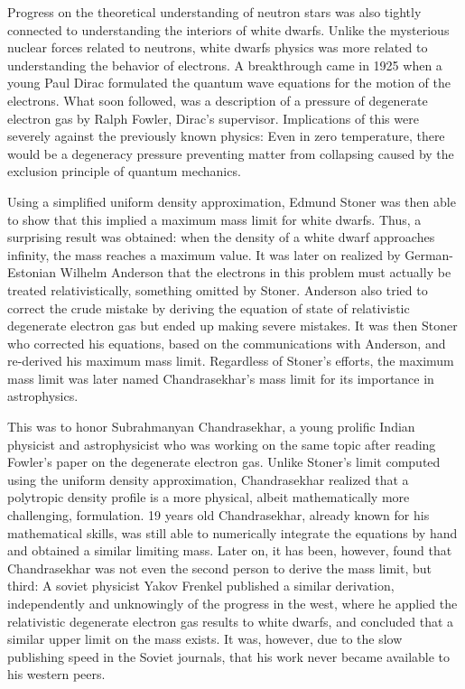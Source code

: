 Progress on the theoretical understanding of neutron stars was also tightly connected to understanding the interiors of white dwarfs.
Unlike the mysterious nuclear forces related to neutrons, white dwarfs physics was more related to understanding the behavior of electrons.
A breakthrough came in 1925 when a young Paul Dirac formulated the quantum wave equations for the motion of the electrons\cite{Dirac25}.
What soon followed, was a description of a pressure of degenerate electron gas by Ralph Fowler, Dirac's supervisor\cite{Fowler26}.
Implications of this were severely against the previously known physics:
Even in zero temperature, there would be a degeneracy pressure preventing matter from collapsing caused by the exclusion principle of quantum mechanics.

Using a simplified uniform density approximation, Edmund Stoner was then able to show that this implied a maximum mass limit for white dwarfs.\cite{Stoner30}
Thus, a surprising result was obtained: when the density of a white dwarf approaches infinity, the mass reaches a maximum value.
It was later on realized by German-Estonian Wilhelm Anderson that the electrons in this problem must actually be treated relativistically\cite{Anderson29}, something omitted by Stoner.
Anderson also tried to correct the crude mistake by deriving the equation of state of relativistic degenerate electron gas but ended up making severe mistakes.
It was then Stoner who corrected his equations, based on the communications with Anderson, and re-derived his maximum mass limit.
Regardless of Stoner's efforts, the maximum mass limit was later named Chandrasekhar's mass limit for its importance in astrophysics.

This was to honor Subrahmanyan Chandrasekhar, a young prolific Indian physicist and astrophysicist who was working on the same topic after reading Fowler's paper on the degenerate electron gas.
Unlike Stoner's limit computed using the uniform density approximation, Chandrasekhar realized that a polytropic density profile is a more physical, albeit mathematically more challenging, formulation.
19 years old Chandrasekhar, already known for his mathematical skills, was still able to numerically integrate the equations by hand and obtained a similar limiting mass\cite{Cha31}.
Later on, it has been, however, found that Chandrasekhar was not even the second person to derive the mass limit, but third:\cite{Yakovlev94}
A soviet physicist Yakov Frenkel published a similar derivation, independently and unknowingly of the progress in the west, where he applied the relativistic degenerate electron gas results to white dwarfs, and concluded that a similar upper limit on the mass exists\cite{Frenkel28}.
It was, however, due to the slow publishing speed in the Soviet journals, that his work never became available to his western peers.

